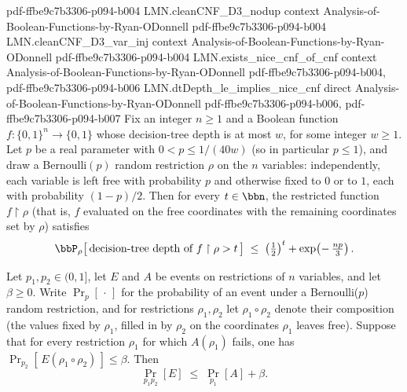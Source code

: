 \begin{theorem}
  {pdf-ffbe9c7b3306-p094-b004}
\proofstep
  {LMN.cleanCNF_D3_nodup}
  {context}
  {Analysis-of-Boolean-Functions-by-Ryan-ODonnell}
  {pdf-ffbe9c7b3306-p094-b004}
\proofstep
  {LMN.cleanCNF_D3_var_inj}
  {context}
  {Analysis-of-Boolean-Functions-by-Ryan-ODonnell}
  {pdf-ffbe9c7b3306-p094-b004}
\proofstep
  {LMN.exists_nice_cnf_of_cnf}
  {context}
  {Analysis-of-Boolean-Functions-by-Ryan-ODonnell}
  {pdf-ffbe9c7b3306-p094-b004,
    pdf-ffbe9c7b3306-p094-b006}
\proofstep
  {LMN.dtDepth_le_implies_nice_cnf}
  {direct}
  {Analysis-of-Boolean-Functions-by-Ryan-ODonnell}
  {pdf-ffbe9c7b3306-p094-b006,
    pdf-ffbe9c7b3306-p094-b007}
Fix an integer $n \ge 1$ and a Boolean function $f : \{0,1\}^n \to \{0,1\}$ whose
decision-tree depth is at most $w$, for some integer $w \ge 1$. Let $p$ be a real
parameter with $0 < p \le 1/(40w)$ (so in particular $p \le 1$), and draw a
Bernoulli$(p)$ random restriction $\rho$ on the $n$ variables: independently, each
variable is left free with probability $p$ and otherwise fixed to $0$ or to $1$, each
with probability $(1-p)/2$. Then for every $t \in \bbn$, the restricted function
$f\restriction\rho$ (that is, $f$ evaluated on the free coordinates with the remaining
coordinates set by $\rho$) satisfies
\[
\bbP_\rho\big[\, \text{decision-tree depth of } f\restriction\rho > t \,\big] \;\le\;
\left(\tfrac12\right)^{t} + \exp\!\left(-\,\tfrac{np}{3}\right).
\]
\end{theorem}

\begin{theorem}
\label{LMN.two_stage_bound}
\leanok
{}
Let $p_1, p_2 \in (0,1]$, let $E$ and $A$ be events on restrictions of $n$ variables,
and let $\beta \ge 0$. Write $\Pr_p[\,\cdot\,]$ for the probability of an event under a
Bernoulli($p$) random restriction, and for restrictions $\rho_1, \rho_2$ let $\rho_1
\circ \rho_2$ denote their composition (the values fixed by $\rho_1$, filled in by
$\rho_2$ on the coordinates $\rho_1$ leaves free). Suppose that for every restriction
$\rho_1$ for which $A(\rho_1)$ fails, one has $\Pr_{p_2}[\,E(\rho_1 \circ \rho_2)\,] \le
\beta$. Then
\[
  \Pr_{p_1 p_2}[E] \;\le\; \Pr_{p_1}[A] + \beta .
\]
\end{theorem}

